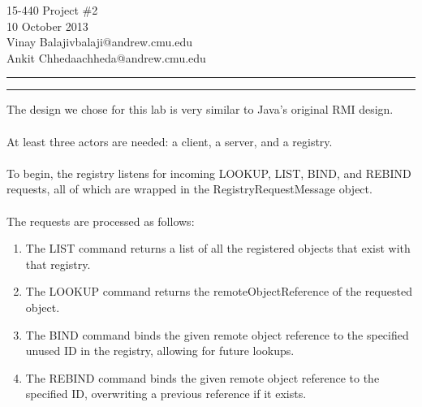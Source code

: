 \documentclass[11pt,letterpaper]{article}
\makeatletter
\newcommand{\h}[1]
                    {\vspace{.25in} \hrule\vspace{0.5em}
                    \noindent{\bf #1 \vspace{0.5em}}
                    \hrule \vspace{.10in}
                    }
\newcommand{\myname}{Vinay Balaji}
\newcommand{\partnername}{Ankit Chheda}
\newcommand{\myandrew}{vbalaji@andrew.cmu.edu}
\newcommand{\partnerandrew}{achheda@andrew.cmu.edu}
\newcommand{\myhwnum}{Project \#2}
\makeatother
\begin{document}
\medskip

\thispagestyle{plain}
\begin{center}                  %
{\Large 15-440 \myhwnum} \\
10 October 2013 \\
\myname\hfill\myandrew \\
\partnername\hfill\partnerandrew \\
\end{center}

\h{Design}

The design we chose for this lab is very similar to Java's original RMI design.\\
\\
At least three actors are needed: a client, a server, and a registry.\\
\\
To begin, the registry listens for incoming LOOKUP, LIST, BIND, and REBIND requests, all of which are wrapped in the RegistryRequestMessage object.\\
\\
The requests are processed as follows:
\begin{enumerate}[i]
\item The LIST command returns a list of all the registered objects that exist with that registry.
\item The LOOKUP command returns the remoteObjectReference of the requested object.
\item The BIND command binds the given remote object reference to the specified unused ID in the registry, allowing for future lookups.
\item The REBIND command binds the given remote object reference to the specified ID, overwriting a previous reference if it exists.
\end{enumerate}
\end{document}
